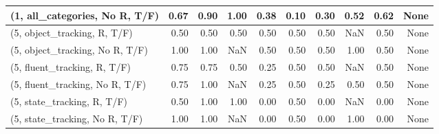 \begin{table*}[h!]
\begin{adjustbox}{width=2\columnwidth,center}
\begin{tabular}{lrrr|rrr|rrr}
(1, all\_categories, No R, T/F)       &                      0.67 &                  0.90 &                      1.00 &                          0.38 &                      0.10 &                          0.30 &                                   0.52 &                               0.62 &                                  None \\



\midrule
(5, object\_tracking, R, T/F)         &                      0.50 &                  0.50 &                      0.50 &                          0.50 &                      0.50 &                          0.50 &                                    NaN &                               0.50 &                                  None \\
(5, object\_tracking, No R, T/F)      &                      1.00 &                  1.00 &                       NaN &                          0.50 &                      0.50 &                          0.50 &                                   1.00 &                               0.50 &                                  None \\
(5, fluent\_tracking, R, T/F)         &                      0.75 &                  0.75 &                      0.50 &                          0.25 &                      0.50 &                          0.50 &                                    NaN &                               0.50 &                                  None \\
(5, fluent\_tracking, No R, T/F)      &                      0.75 &                  1.00 &                       NaN &                          0.25 &                      0.50 &                          0.25 &                                   0.50 &                               0.50 &                                  None \\
(5, state\_tracking, R, T/F)          &                      0.50 &                  1.00 &                      1.00 &                          0.00 &                      0.50 &                          0.00 &                                    NaN &                               0.00 &                                  None \\
(5, state\_tracking, No R, T/F)       &                      1.00 &                  1.00 &                       NaN &                          0.00 &                      0.50 &                          0.00 &                                   1.00 &                               0.00 &                                  None \\

\end{tabular}
\end{adjustbox}
\end{table*}
